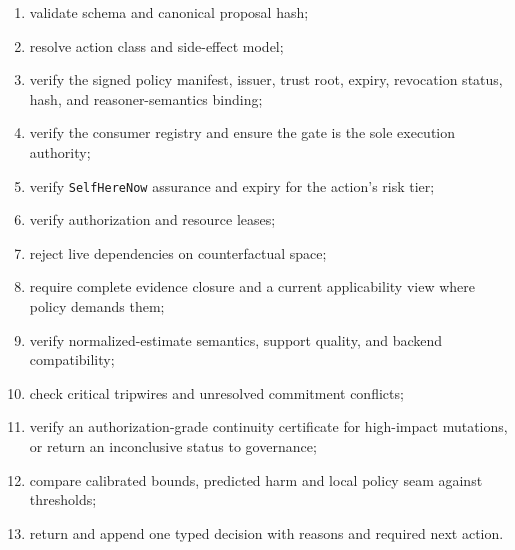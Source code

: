 \documentclass[11pt,oneside]{report}
\newcommand{\SelfHereNow}{\texttt{SelfHereNow}}
\begin{document}
\begin{enumerate}
  \item validate schema and canonical proposal hash;
  \item resolve action class and side-effect model;
  \item verify the signed policy manifest, issuer, trust root, expiry, revocation status, hash, and reasoner-semantics binding;
  \item verify the consumer registry and ensure the gate is the sole execution authority;
  \item verify \SelfHereNow{} assurance and expiry for the action's risk tier;
  \item verify authorization and resource leases;
  \item reject live dependencies on counterfactual space;
  \item require complete evidence closure and a current applicability view where policy demands them;
  \item verify normalized-estimate semantics, support quality, and backend compatibility;
  \item check critical tripwires and unresolved commitment conflicts;
  \item verify an authorization-grade continuity certificate for high-impact mutations, or return an inconclusive status to governance;
  \item compare calibrated bounds, predicted harm and local policy seam against thresholds;
  \item return and append one typed decision with reasons and required next action.
\end{enumerate}
\end{document}
